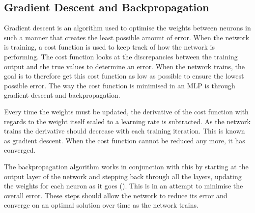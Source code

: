\documentclass[12pt]{report}
\begin{document}
\subsection{Gradient Descent and Backpropagation}
\begin{flushleft}
Gradient descent is an algorithm used to optimise the weights between neurons in such a manner that creates the least possible amount of error. When the network is training, a cost function is used to keep track of how the network is performing. The cost function looks at the discrepancies between the training output and the true values to determine an error. When the network trains, the goal is to therefore get this cost function as low as possible to ensure the lowest possible error. The way the cost function is minimised in an MLP is through gradient descent and backpropagation.

Every time the weights must be updated, the derivative of the cost function with regards to the weight itself scaled to a learning rate is subtracted. As the network trains the derivative should decrease with each training iteration. This is known as gradient descent. When the cost function cannot be reduced any more, it has converged.

The backpropagation algorithm works in conjunction with this by starting at the output layer of the network and stepping back through all the layers, updating the weights for each neuron as it goes (\cite{rumelhart1985learning}). This is in an attempt to minimise the overall error. These steps should allow the network to reduce its error and converge on an optimal solution over time as the network trains.
\end{flushleft}
\end{document}

